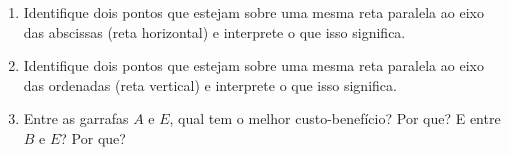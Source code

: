 \begin{enumerate}
\begin{enumerate}
\item {} 
Identifique dois pontos que estejam sobre uma mesma reta paralela ao eixo das abscissas (reta horizontal) e interprete o que isso significa.

\item {} 
Identifique dois pontos que estejam sobre uma mesma reta paralela ao eixo das ordenadas (reta vertical) e interprete o que isso significa.

\item {} 
Entre as garrafas \(A\) e \(E\), qual tem o melhor custo-benefício? Por que? E entre \(B\) e \(E\)? Por que?

\end{enumerate}
\end{enumerate}


